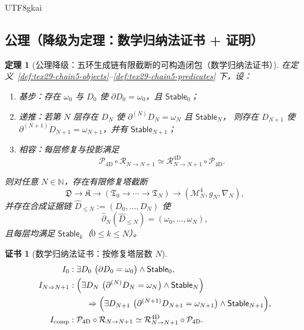 \documentclass[12pt]{article}
\newtheorem{theorem}{定理}[section]
\newtheorem{Certificate}{证书}[section]
\newcommand{\NN}{\mathbb{N}}
\begin{document}
\begin{CJK*}{UTF8}{gkai}
\subsection{公理（降级为定理：数学归纳法证书 + 证明）}
\label{subsec:tex29-chain-discrete-kqemb-tower-4d-axiom}

\begin{theorem}[公理降级：五环生成链有限截断的可构造闭包（数学归纳法证书）]
\label{thm:tex29-chain5-axiom-downgraded}
在定义~\ref{def:tex29-chain5-objects}--\ref{def:tex29-chain5-predicates} 下，设：
\begin{enumerate}
  \item[(A1)] 基步：存在 $\omega_0$ 与 $D_0$ 使 $\partial D_0=\omega_0$，且 $\mathsf{Stable}_0$；
  \item[(A2)] 递推：若第 $N$ 层存在 $D_N$ 使 $\partial^{(N)}D_N=\omega_N$ 且 $\mathsf{Stable}_N$，
  则存在 $D_{N+1}$ 使 $\partial^{(N+1)}D_{N+1}=\omega_{N+1}$，并有 $\mathsf{Stable}_{N+1}$；
  \item[(A3)] 相容：每层修复与投影满足
  \[
    \mathcal{P}_{\mathrm{4D}}\circ \mathcal{R}_{N\to N+1}
    \simeq
    \mathcal{R}^{\mathrm{4D}}_{N\to N+1}\circ \mathcal{P}_{\mathrm{4D}}.
  \]
\end{enumerate}
则对任意 $N\in\NN$，存在有限修复塔截断
\[
  \mathfrak{D}\to\mathfrak{K}\to(\mathfrak{T}_0\to\cdots\to\mathfrak{T}_N)\to(\mathcal{M}^{4}_{N},g_N,\nabla_N),
\]
并存在合成证据链 $\widehat{D}_{\le N}:=(D_0,\dots,D_N)$ 使
\[
  \widehat{\partial}_N(\widehat{D}_{\le N})=(\omega_0,\dots,\omega_N),
\]
且每层均满足 $\mathsf{Stable}_k$（$0\le k\le N$）。
\end{theorem}

\begin{Certificate}[数学归纳法证书：按修复塔层数 $N$]
\label{cert:tex29-chain5-axiom-downgraded}
\[
\begin{aligned}
  I_0 &:\exists D_0\ \bigl(\partial D_0=\omega_0\bigr)\wedge \mathsf{Stable}_0,\\
  I_{N\Rightarrow N+1} &: \Bigl(\exists D_N\ \bigl(\partial^{(N)}D_N=\omega_N\bigr)\wedge \mathsf{Stable}_N\Bigr)\\
  &\qquad\Rightarrow \Bigl(\exists D_{N+1}\ \bigl(\partial^{(N+1)}D_{N+1}=\omega_{N+1}\bigr)\wedge \mathsf{Stable}_{N+1}
    \Bigr),\\
  I_{\mathrm{comp}} &: \mathcal{P}_{\mathrm{4D}}\circ \mathcal{R}_{N\to N+1}
  \simeq
  \mathcal{R}^{\mathrm{4D}}_{N\to N+1}\circ \mathcal{P}_{\mathrm{4D}}.
\end{aligned}
\]
\end{Certificate}


\end{CJK*}
\end{document}
